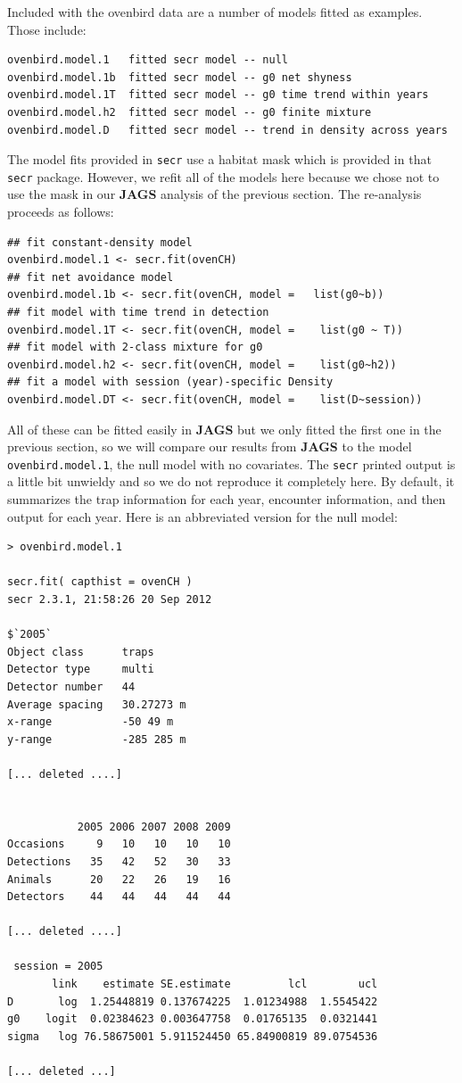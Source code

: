 Included with the ovenbird data are a number of  models fitted as
examples. Those include:
{\small
\begin{verbatim}
ovenbird.model.1   fitted secr model -- null
ovenbird.model.1b  fitted secr model -- g0 net shyness
ovenbird.model.1T  fitted secr model -- g0 time trend within years
ovenbird.model.h2  fitted secr model -- g0 finite mixture
ovenbird.model.D   fitted secr model -- trend in density across years
\end{verbatim}
}
The model fits provided in \mbox{\tt secr} use a habitat mask which is
provided in that \mbox{\tt secr} package. 
However, we
refit all of the models here because we chose not to use the mask in
our {\bf JAGS} analysis of the previous section. 
The re-analysis proceeds as follows:
{\small 
\begin{verbatim}
## fit constant-density model
ovenbird.model.1 <- secr.fit(ovenCH)
## fit net avoidance model
ovenbird.model.1b <- secr.fit(ovenCH, model =   list(g0~b))
## fit model with time trend in detection
ovenbird.model.1T <- secr.fit(ovenCH, model =    list(g0 ~ T))
## fit model with 2-class mixture for g0
ovenbird.model.h2 <- secr.fit(ovenCH, model =    list(g0~h2))
## fit a model with session (year)-specific Density
ovenbird.model.DT <- secr.fit(ovenCH, model =    list(D~session))
\end{verbatim}
}

All of these can be fitted easily in {\bf JAGS} but 
we only fitted the first one in the previous section, so we will
compare our results from {\bf JAGS} to the 
model {\tt ovenbird.model.1}, the null model with no covariates.
The \mbox{\tt secr} printed output is a little bit unwieldy and so we
do not reproduce it completely here. By default, it summarizes the
trap information for each year, encounter information, and then output for
each year. Here is an abbreviated version for the null model:
{\small
\begin{verbatim}
> ovenbird.model.1

secr.fit( capthist = ovenCH )
secr 2.3.1, 21:58:26 20 Sep 2012

$`2005`
Object class      traps 
Detector type     multi 
Detector number   44 
Average spacing   30.27273 m 
x-range           -50 49 m 
y-range           -285 285 m 

[... deleted ....]


           2005 2006 2007 2008 2009
Occasions     9   10   10   10   10
Detections   35   42   52   30   33
Animals      20   22   26   19   16
Detectors    44   44   44   44   44

[... deleted ....]

 session = 2005 
       link    estimate SE.estimate         lcl        ucl
D       log  1.25448819 0.137674225  1.01234988  1.5545422
g0    logit  0.02384623 0.003647758  0.01765135  0.0321441
sigma   log 76.58675001 5.911524450 65.84900819 89.0754536

[... deleted ...]
\end{verbatim}
}

